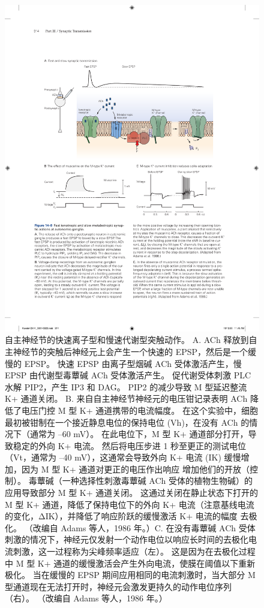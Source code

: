 \begin{figure}[htbp]
	\centering
	\includegraphics[width=0.8\linewidth]{chap14/fig_14_8}
	\caption{自主神经节的快速离子型和慢速代谢型突触动作。 A. ACh 释放到自主神经节的突触后神经元上会产生一个快速的 EPSP，然后是一个缓慢的 EPSP。 快速 EPSP 由离子型烟碱 ACh 受体激活产生，慢 EPSP 由代谢型毒蕈碱 ACh 受体激活产生。 促代谢受体刺激 PLC 水解 PIP2，产生 IP3 和 DAG。 PIP2 的减少导致 M 型延迟整流 K+ 通道关闭。 B. 来自自主神经节神经元的电压钳记录表明 ACh 降低了电压门控 M 型 K+ 通道携带的电流幅度。 在这个实验中，细胞最初被钳制在一个接近静息电位的保持电位 (Vh)，在没有 ACh 的情况下（通常为 –60 mV）。 在此电位下，M 型 K+ 通道部分打开，导致稳定的外向 K+ 电流。 然后将电压步进 1 秒至更正的测试电位（Vt，通常为 –40 mV），这通常会导致外向 K+ 电流 (IK) 缓慢增加，因为 M 型 K+ 通道对更正的电压作出响应 增加他们的开放（控制）。 毒蕈碱（一种选择性刺激毒蕈碱 ACh 受体的植物生物碱）的应用导致部分 M 型 K+ 通道关闭。 这通过关闭在静止状态下打开的 M 型 K+ 通道，降低了保持电位下的外向 K+ 电流（注意基线电流的变化，ΔIK），并降低了响应阶跃的缓慢激活 K+ 电流的幅度 去极化。 （改编自 Adams 等人，1986 年。）C. 在没有毒蕈碱 ACh 受体刺激的情况下，神经元仅发射一个动作电位以响应长时间的去极化电流刺激，这一过程称为尖峰频率适应（左）。 这是因为在去极化过程中 M 型 K+ 通道的缓慢激活会产生外向电流，使膜在阈值以下重新极化。 当在缓慢的 EPSP 期间应用相同的电流刺激时，当大部分 M 型通道现在无法打开时，神经元会激发更持久的动作电位序列（右）。 （改编自 Adams 等人，1986 年。）}
	\label{fig:14_8}
\end{figure}


